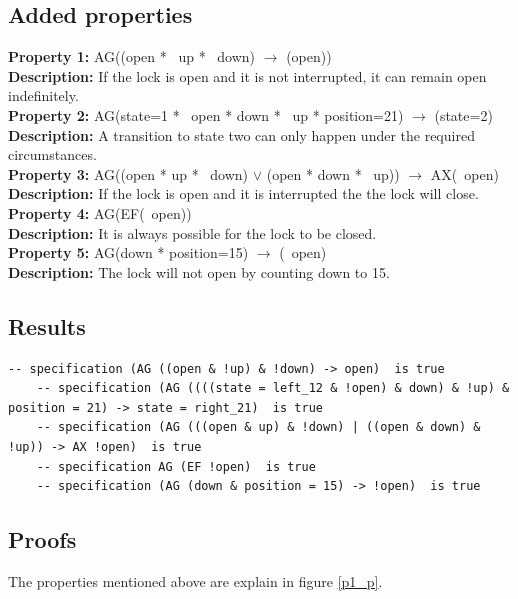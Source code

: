 \documentclass[11pt]{article}
\begin{document}
	\subsection{Added properties}
	\textbf{Property 1:} AG((open * ~up * ~down) $\to$ (open)) 	\\	
	\textbf{Description:} If the lock is open and it is not interrupted, it can remain open indefinitely. \\
	\vspace{12pt}
	\textbf{Property 2:} AG(state=1 * ~open * down  * ~up * position=21) $\to$ (state=2)\\ 
	\textbf{Description:} A transition to state two can only happen under the required circumstances. \\
	\vspace{12pt}
	\textbf{Property 3:} AG((open * up * ~down) $\vee$  (open * down * ~up)) $\to$ AX(~open)\\ \textbf{Description:} If the lock is open and it is interrupted the the lock will close. \\
	\vspace{12pt}
	\textbf{Property 4:} AG(EF(~open)) \\
	\textbf{Description:} It is always possible for the lock to be closed.\\
	\vspace{12pt}
	\textbf{Property 5:} AG(down * position=15) $\to$ (~open) \\
	\textbf{Description:} The lock will not open by counting down to 15.\\

	
	\subsection{Results}
 \begin{lstlisting}[caption=NuSMV Output, label=p1_out]		
	-- specification (AG ((open & !up) & !down) -> open)  is true
	-- specification (AG ((((state = left_12 & !open) & down) & !up) & position = 21) -> state = right_21)  is true
	-- specification (AG (((open & up) & !down) | ((open & down) & !up)) -> AX !open)  is true
	-- specification AG (EF !open)  is true
	-- specification (AG (down & position = 15) -> !open)  is true

  \end{lstlisting}
	


\subsection{Proofs}
The properties mentioned above are explain in figure \ref{p1_p}.
\end{document}
